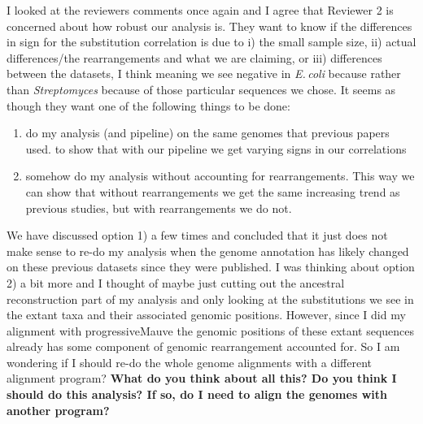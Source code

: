 \documentclass[12pt]{article}
\newcommand{\p}{progressiveMauve\xspace}
\newcommand{\strep}{\textit{Streptomyces}\xspace}
\newcommand{\ecol}{\textit{E.\,coli}\xspace}
\begin{document}
I looked at the reviewers comments once again and I agree that Reviewer 2 is concerned about how robust our analysis is.
They want to know if the differences in sign for the substitution correlation is due to i) the small sample size, ii) actual differences/the rearrangements and what we are claiming, or iii) differences between the datasets, I think meaning we see negative in \ecol because rather than \strep because of those particular sequences we chose.
It seems as though they want one of the following things to be done:
\begin{enumerate}
	\item do my analysis (and pipeline) on the same genomes that previous papers used. to show that with our pipeline we get varying signs in our correlations
	\item somehow do my analysis without accounting for rearrangements. This way we can show that without rearrangements we get the same increasing trend as previous studies, but with rearrangements we do not.
\end{enumerate}

We have discussed option 1) a few times and concluded that it just does not make sense to re-do my analysis when the genome annotation has likely changed on these previous datasets since they were published.
I was thinking about option 2) a bit more and I thought of maybe just cutting out the ancestral reconstruction part of my analysis and only looking at the substitutions we see in the extant taxa and their associated genomic positions.
However, since I did my alignment with \p the genomic positions of these extant sequences already has some component of genomic rearrangement accounted for.
So I am wondering if I should re-do the whole genome alignments with a different alignment program?
\textbf{What do you think about all this? Do you think I should do this analysis? If so, do I need to align the genomes with another program?}
\end{document}
